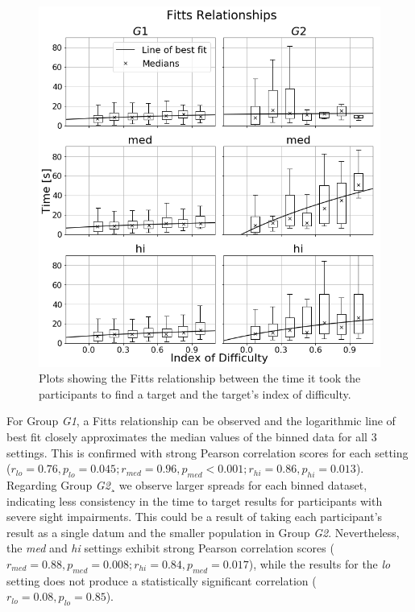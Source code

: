 \documentclass[]{interact}
\begin{document}
\begin{figure}
  \centering
  \includegraphics[width=1.0\textwidth]{figures/fitts_fit.png}
  \caption{Plots showing the Fitts relationship between the time it took the participants to find a target and the target's index of difficulty. }\label{fig:fitts-results}
\end{figure}

For Group \textit{G1}, a Fitts relationship can be observed and the logarithmic line of best fit closely approximates the median values of the binned data for all 3 settings. 
This is confirmed with strong Pearson correlation scores for each setting ($r_{lo} = 0.76, p_{lo} = 0.045; r_{med} = 0.96, p_{med}<0.001; r_{hi} = 0.86, p_{hi} = 0.013$).
Regarding Group \textit{G2}¸ we observe larger spreads for each binned dataset, indicating less consistency in the time to target results for participants with severe sight impairments.
This could be a result of taking each participant's result as a single datum and the smaller population in Group \textit{G2}.
Nevertheless, the \textit{med} and \textit{hi} settings exhibit strong Pearson correlation scores ($r_{med} = 0.88, p_{med} = 0.008; r_{hi} = 0.84, p_{med} = 0.017$), while the results for the \textit{lo} setting does not produce a statistically significant correlation ($r_{lo} = 0.08, p_{lo} = 0.85$).
\end{document}
